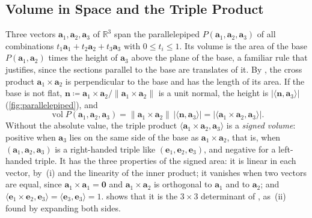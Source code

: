 \subsection{Volume in Space and the Triple Product}

Three vectors $\mathbf a_1,\mathbf a_2,\mathbf a_3$ of $\mathbb R^3$ span the parallelepiped $P(\mathbf a_1,\mathbf a_2,\mathbf a_3)$ of all combinations $t_1\mathbf a_1+t_2\mathbf a_2+t_3\mathbf a_3$ with $0\le t_i\le1$. Its volume is the area of the base $P(\mathbf a_1,\mathbf a_2)$ times the height of $\mathbf a_3$ above the plane of the base, a familiar rule that  justifies, since the sections parallel to the base are translates of it. By , the cross product $\mathbf a_1\times\mathbf a_2$ is perpendicular to the base and has the length of its area. If the base is not flat, $\mathbf n\coloneqq\mathbf a_1\times\mathbf a_2/\|\mathbf a_1\times\mathbf a_2\|$ is a unit normal, the height is $|\langle\mathbf n,\mathbf a_3\rangle|$ (\cref{fig:parallelepiped}), and
\[
\operatorname{vol}P(\mathbf a_1,\mathbf a_2,\mathbf a_3)=\|\mathbf a_1\times\mathbf a_2\|\,|\langle\mathbf n,\mathbf a_3\rangle|=\bigl|\langle\mathbf a_1\times\mathbf a_2,\mathbf a_3\rangle\bigr| .
\]
Without the absolute value, the triple product $\langle\mathbf a_1\times\mathbf a_2,\mathbf a_3\rangle$ is a \emph{signed volume}: positive when $\mathbf a_3$ lies on the same side of the base as $\mathbf a_1\times\mathbf a_2$, that is, when $(\mathbf a_1,\mathbf a_2,\mathbf a_3)$ is a right-handed triple like $(\mathbf e_1,\mathbf e_2,\mathbf e_3)$, and negative for a left-handed triple. It has the three properties of the signed area: it is linear in each vector, by \,(i) and the linearity of the inner product; it vanishes when two vectors are equal, since $\mathbf a_1\times\mathbf a_1=\mathbf 0$ and $\mathbf a_1\times\mathbf a_2$ is orthogonal to $\mathbf a_1$ and to $\mathbf a_2$; and $\langle\mathbf e_1\times\mathbf e_2,\mathbf e_3\rangle=\langle\mathbf e_3,\mathbf e_3\rangle=1$.  shows that it is the $3\times3$ determinant of , as \,(ii) found by expanding both sides.

